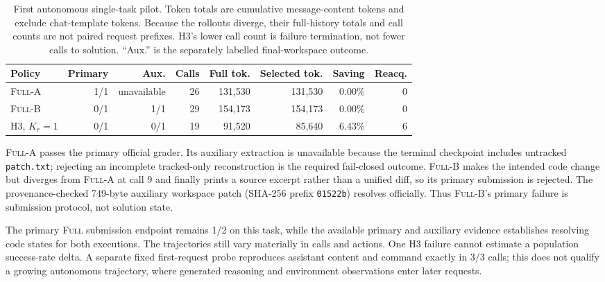\documentclass[11pt]{article}
\begin{document}
\begin{table}[H]
\centering
\scriptsize
\caption{First autonomous single-task pilot. Token totals are
cumulative message-content tokens and exclude chat-template tokens. Because
the rollouts diverge, their full-history totals and call counts are not paired
request prefixes. H3's lower call count is failure termination, not fewer calls
to solution. ``Aux.'' is the separately labelled final-workspace outcome.}
\label{tab:first-autonomous}
\begin{tabular}{lrrrrrrr}
\toprule
Policy & Primary & Aux. & Calls & Full tok. & Selected tok. & Saving & Reacq. \\
\midrule
\textsc{Full}-A & 1/1 & unavailable & 26 & 131,530 & 131,530 & 0.00\% & 0 \\
\textsc{Full}-B & 0/1 & 1/1 & 29 & 154,173 & 154,173 & 0.00\% & 0 \\
H3, $K_r=1$ & 0/1 & 0/1 & 19 & 91,520 & 85,640 & 6.43\% & 6 \\
\bottomrule
\end{tabular}
\end{table}

\textsc{Full}-A passes the primary official grader. Its auxiliary extraction is
unavailable because the terminal checkpoint includes untracked
\texttt{patch.txt}; rejecting an incomplete tracked-only reconstruction is the
required fail-closed outcome. \textsc{Full}-B makes the intended code change but
diverges from \textsc{Full}-A at call 9 and finally prints a source excerpt
rather than a unified diff, so its primary submission is rejected. The
provenance-checked 749-byte auxiliary workspace patch (SHA-256 prefix
\texttt{01522b}) resolves officially. Thus \textsc{Full}-B's primary failure is
submission protocol, not solution state.

The primary \textsc{Full} submission endpoint remains 1/2 on this task, while
the available primary and auxiliary evidence establishes resolving code states
for both executions. The trajectories still vary materially in calls and
actions. One H3 failure cannot estimate a population success-rate delta.
A separate fixed first-request probe reproduces assistant content and command
exactly in 3/3 calls; this does not qualify a growing autonomous trajectory,
where generated reasoning and environment observations enter later requests.
\end{document}

